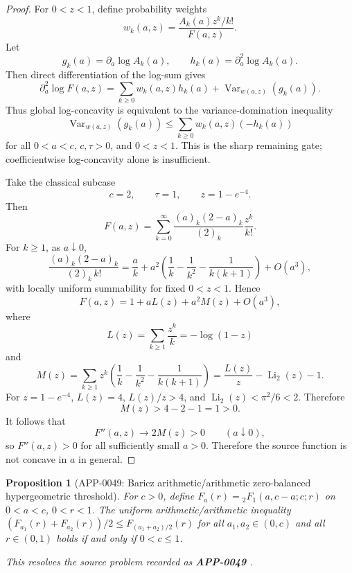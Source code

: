 \documentclass[11pt]{article}
\numberwithin{equation}{section}
\newtheorem{proposition}[theorem]{Proposition}
\theoremstyle{definition}
\theoremstyle{remark}
\newcommand{\1}{\mathbf 1}
\begin{document}
\begin{proof}
For \(0<z<1\), define probability weights
\[
w_k(a,z)=\frac{A_k(a)z^k/k!}{F(a,z)}.
\]
Let
\[
g_k(a)=\partial_a\log A_k(a),
\qquad
h_k(a)=\partial_a^2\log A_k(a).
\]
Then direct differentiation of the log-sum gives
\[
\partial_a^2\log F(a,z)
=
\sum_{k\ge0}w_k(a,z)h_k(a)
+\operatorname{Var}_{w(a,z)}(g_k(a)).
\]
Thus global log-concavity is equivalent to the variance-domination inequality
\[
\operatorname{Var}_{w(a,z)}(g_k(a))
\le
\sum_{k\ge0}w_k(a,z)(-h_k(a))
\]
for all \(0<a<c\), \(c,\tau>0\), and \(0<z<1\). This is the sharp remaining gate; coefficientwise log-concavity alone is insufficient.

Take the classical subcase
\[
c=2,\qquad \tau=1,\qquad z=1-e^{-4}.
\]
Then
\[
F(a,z)=
\sum_{k=0}^{\infty}
\frac{(a)_k(2-a)_k}{(2)_k}\frac{z^k}{k!}.
\]
For \(k\ge1\), as \(a\downarrow0\),
\[
\frac{(a)_k(2-a)_k}{(2)_k\,k!}
=
\frac{a}{k}
+a^2\left(
\frac1k-\frac1{k^2}-\frac1{k(k+1)}
\right)+O(a^3),
\]
with locally uniform summability for fixed \(0<z<1\). Hence
\[
F(a,z)=1+aL(z)+a^2M(z)+O(a^3),
\]
where
\[
L(z)=\sum_{k\ge1}\frac{z^k}{k}=-\log(1-z)
\]
and
\[
M(z)=
\sum_{k\ge1}z^k
\left(
\frac1k-\frac1{k^2}-\frac1{k(k+1)}
\right)
=
\frac{L(z)}{z}-\operatorname{Li}_2(z)-1.
\]
For \(z=1-e^{-4}\), \(L(z)=4\), \(L(z)/z>4\), and \(\operatorname{Li}_2(z)<\pi^2/6<2\). Therefore
\[
M(z)>4-2-1=1>0.
\]
It follows that
\[
F''(a,z)\to2M(z)>0
\qquad(a\downarrow0),
\]
so \(F''(a,z)>0\) for all sufficiently small \(a>0\). Therefore the source function is not concave in \(a\) in general.
\end{proof}

\begin{proposition}[APP-0049: Baricz arithmetic/arithmetic zero-balanced hypergeometric threshold]
\label{res:baricz-aa-zero-balanced-concavity-threshold}
For \(c>0\), define \(F_a(r)={}_2F_1(a,c-a;c;r)\) on \(0<a<c\), \(0<r<1\). The uniform arithmetic/arithmetic inequality \((F_{a_1}(r)+F_{a_2}(r))/2\le F_{(a_1+a_2)/2}(r)\) for all \(a_1,a_2\in(0,c)\) and all \(r\in(0,1)\) holds if and only if \(0<c\le1\).

This resolves the source problem recorded as \textbf{APP-0049} \cite{app-app-0049-source}.
\end{proposition}
\end{document}
